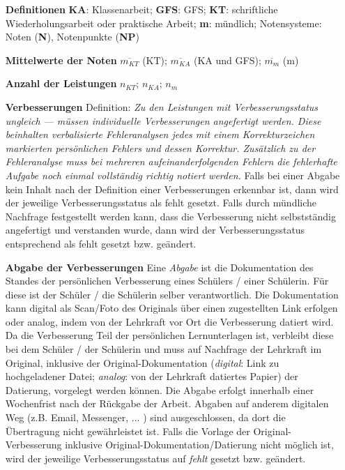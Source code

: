 \documentclass{article}
\begin{document}
\vspace*{-1cm}
\begin{enumerate}[label=\textbf{\textbullet}, align=left, leftmargin=*]
	\item[\textbf{Definitionen}] { \scriptsize \textbf{KA}: Klassenarbeit; \textbf{GFS}: GFS; \textbf{KT}: schriftliche Wiederholungsarbeit oder praktische Arbeit; \textbf{m}: mündlich; Notensysteme: Noten (\textbf{N}), Notenpunkte (\textbf{NP}) }
	\item[\textbf{Mittelwerte der Noten}] $\overline{m_{KT}}$ (KT); $\overline{m_{KA}}$ (KA und GFS); $\overline{m_{m}}$ (m)
	\item[\textbf{Anzahl der Leistungen}] $n_{KT}$; $n_{KA}$; $n_{m}$
	\item[\textbf{Verbesserungen}] { \scriptsize Definition: \glqq\textit{Zu den Leistungen mit Verbesserungsstatus ungleich \glqq ---\grqq{} müssen \textit{individuelle} Verbesserungen angefertigt werden. Diese beinhalten verbalisierte Fehleranalysen jedes mit einem Korrekturzeichen markierten \textit{persönlichen} Fehlers und dessen Korrektur. Zusätzlich zu der Fehleranalyse muss bei mehreren aufeinanderfolgenden Fehlern die fehlerhafte Aufgabe noch einmal vollständig richtig notiert werden.}\grqq{} Falls bei einer Abgabe kein Inhalt nach der Definition einer Verbesserungen erkennbar ist, dann wird der jeweilige Verbesserungsstatus als \glqq fehlt\grqq{} gesetzt.  Falls durch mündliche Nachfrage festgestellt werden kann, dass die Verbesserung nicht selbstständig angefertigt und verstanden wurde, dann wird der Verbesserungsstatus entsprechend als \glqq fehlt\grqq{} gesetzt bzw. geändert.}
	\item[\textbf{Abgabe der Verbesserungen}] { \scriptsize Eine \glqq \textit{Abgabe}\grqq{} ist die Dokumentation des Standes der persönlichen Verbesserung eines Schülers / einer Schülerin. Für diese ist der Schüler / die Schülerin selber verantwortlich. Die Dokumentation kann digital als Scan/Foto des Originals über einen zugestellten Link erfolgen oder analog, indem von der Lehrkraft vor Ort die Verbesserung datiert wird. Da die Verbesserung Teil der persönlichen Lernunterlagen ist, verbleibt diese bei dem Schüler / der Schülerin und muss auf Nachfrage der Lehrkraft im Original, inklusive der Original-Dokumentation (\textit{digital}: Link zu hochgeladener Datei; \textit{analog}: von der Lehrkraft datiertes Papier) der Datierung, vorgelegt werden können. Die Abgabe erfolgt innerhalb einer Wochenfrist nach der Rückgabe der Arbeit. Abgaben auf anderem digitalen Weg (z.B. Email, Messenger, ... ) sind ausgeschlossen, da dort die Übertragung nicht gewährleistet ist. Falls die Vorlage der Original-Verbesserung inklusive Original-Dokumentation/Datierung nicht möglich ist, wird der jeweilige Verbesserungsstatus auf \glqq \textit{fehlt}\grqq{} gesetzt bzw. geändert.} 

\end{enumerate}
\end{document}
